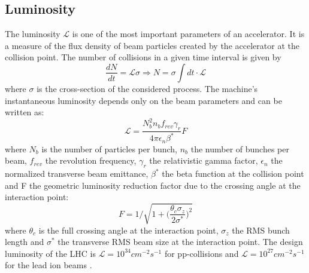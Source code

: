 \subsection{\label{sec:exp_LHC_2}Luminosity}
\noindent The luminosity $\mathcal{L}$ is one of the most important parameters of an accelerator. It is a measure of the flux density of beam particles created by the accelerator at the collision point. The number of collisions in a given time interval is given by 
\begin{equation}
    \frac{dN}{dt} = \mathcal{L} \sigma \Longrightarrow N = \sigma \int dt \cdot  \mathcal{L} 
\end{equation}
where $\sigma$ is the cross-section of the considered process. The machine's instantaneous luminosity depends only on the beam parameters and can be written as:
\begin{equation}
    \mathcal{L} = \frac{N_b^2 n_b f_{rev} \gamma_r}{4 \pi \epsilon_n \beta^{*}} F
\end{equation}
where $N_b$ is the number  of particles per bunch, $n_b $ the number of bunches per beam, $f_{rev}$ the revolution frequency, $\gamma_r$
the relativistic gamma factor, $\epsilon_n$ the normalized transverse beam emittance, $\beta^{*}$ the beta function at the collision point and F the geometric luminosity reduction factor due to the crossing angle at the interaction point:
\begin{equation}
    F = 1/ \sqrt{1 + \bigg(\frac{\theta_c \sigma_z}{2\sigma^{*}}\bigg)^2}
\end{equation}
where $\theta_c$ is the full crossing angle at the interaction point, $\sigma_z$ the RMS bunch length and $\sigma^{*}$ the transverse RMS beam size at the interaction point.
The design luminosity of the LHC is $\mathcal{L}= 10^{34} cm^{-2}s^{-1}$ for pp-collisions and $\mathcal{L} = 10^{27} cm^{-2}s^{-1}$ for the lead ion beams \cite{Brüning:782076}.

